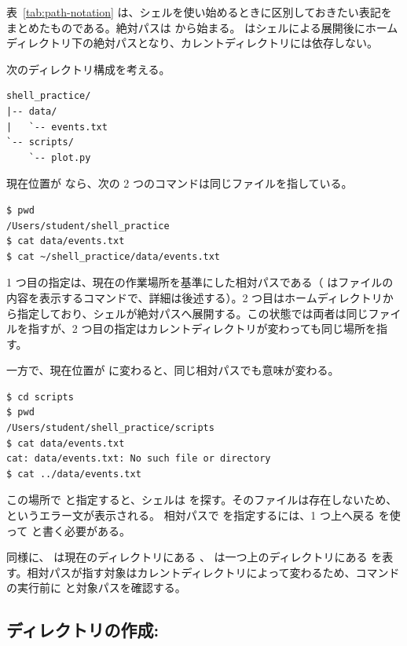 表~\ref{tab:path-notation} は、シェルを使い始めるときに区別しておきたい表記をまとめたものである。絶対パスは \code{/} から始まる。 はシェルによる展開後にホームディレクトリ下の絶対パスとなり、カレントディレクトリには依存しない。

次のディレクトリ構成を考える。

\begin{lstlisting}[numbers=none, xleftmargin=2\zw]
shell_practice/
|-- data/
|   `-- events.txt
`-- scripts/
    `-- plot.py
\end{lstlisting}

現在位置が  なら、次の 2 つのコマンドは同じファイルを指している。

\begin{lstlisting}[numbers=none, xleftmargin=2\zw]
$ pwd
/Users/student/shell_practice
$ cat data/events.txt
$ cat ~/shell_practice/data/events.txt
\end{lstlisting}

1 つ目の指定は、現在の作業場所を基準にした相対パスである（ はファイルの内容を表示するコマンドで、詳細は後述する）。2 つ目はホームディレクトリから指定しており、シェルが絶対パスへ展開する。この状態では両者は同じファイルを指すが、2 つ目の指定はカレントディレクトリが変わっても同じ場所を指す。

一方で、現在位置が  に変わると、同じ相対パスでも意味が変わる。

\begin{lstlisting}[numbers=none, xleftmargin=2\zw]
$ cd scripts
$ pwd
/Users/student/shell_practice/scripts
$ cat data/events.txt
cat: data/events.txt: No such file or directory
$ cat ../data/events.txt
\end{lstlisting}

この場所で  と指定すると、シェルは  を探す。そのファイルは存在しないため、 というエラー文が表示される。
相対パスで  を指定するには、1 つ上へ戻る  を使って  と書く必要がある。

同様に、 は現在のディレクトリにある 、 は一つ上のディレクトリにある  を表す。相対パスが指す対象はカレントディレクトリによって変わるため、コマンドの実行前に  と対象パスを確認する。

\subsection{ディレクトリの作成: }

